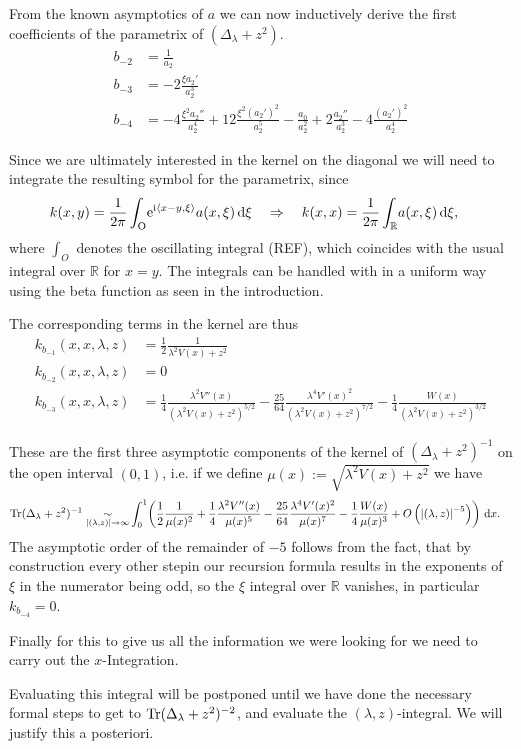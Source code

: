 From the known asymptotics of $a$ we can now inductively derive the first
coefficients of the parametrix of $(\Delta_\lambda + z^2)$.
\begin{align*}
  b_{-2} &= \frac{1}{a_2} \\
  b_{-3} &= -2\frac{\xi a_2'}{a_2^3}\\
  b_{-4} &= -4\frac{\xi^2 a_2''}{a_2^4}
  + 12\frac{\xi^2 (a_2')^2}{a_2^5} - \frac{a_0}{a_2^2} +
  2\frac{a_2''}{a_2^3} -4\frac{(a_2')^2}{a_2^4}
  \label{eqn:coeff-symbol}
\end{align*}

Since we are ultimately interested in the kernel on the diagonal we will need to
integrate the resulting symbol for the parametrix, since
\begin{align*}
  k(x,y) &= \frac{1}{2\pi}\Oscint{\xi}{
    \Eto{\mathrm i\left\langle x-y, \xi\right\rangle} a(x,\xi)
  }
  \quad
  \Rightarrow
  \quad
  k(x,x) = \frac{1}{2\pi}\Integ{\mathbb{R}}{\xi}{a(x,\xi)},
\end{align*}
where $\int_{O}$ denotes the oscillating integral (REF), which coincides with
the usual integral over $\mathbb{R}$ for $x = y$. The integrals can be handled
with in a uniform way using the beta function as seen in the introduction.

The corresponding terms in the kernel are thus
\begin{align}
  k_{b_{-1}}(x,x,\lambda,z) &= \frac{1}{2} \frac{1}{\lambda^2 V(x) + z^2} \\
  k_{b_{-2}}(x,x,\lambda,z) &= 0 \\
  k_{b_{-3}}(x,x,\lambda,z) &= \frac{1}{4} \frac{\lambda^2 V''(x)}{(\lambda^2
    V(x) + z^2)^{5/2}} - \frac{25}{64} \frac{\lambda^4 V'(x)^2}{(\lambda^2V(x)
    + z^2)^{7/2}} -\frac{1}{4}\frac{W(x)}{(\lambda^2 V(x) + z^2)^{3/2}}
  \label{eqn:coeff-kernel}
\end{align}

These are the first three asymptotic components of the kernel of
$(\Delta_\lambda + z^2)^{-1}$ on the open interval $(0,1)$, i.e. if we define
$\mu(x) := \sqrt{\lambda^2 V(x) + z^2}$ we have
\begin{align*}
  \Tr(\Delta_\lambda + z^2)^{-1} \SimAs{\Abs{(\lambda, z)}\to\infty}&
   \Int{x}{\left(
      \frac12\frac1{\mu(x)^{2}}
     +\frac14\frac{\lambda^2 V''(x)}{\mu(x)^5}
     -\frac{25}{64}\frac{\lambda^4V'(x)^2}{\mu(x)^7}
     -\frac14\frac{W(x)}{\mu(x)^3}
     +O\left(\Abs{(\lambda, z)}^{-5}\right)
   \right)}.
\end{align*}
The asymptotic order of the remainder of $-5$ follows from the fact, that by
construction every other stepin our recursion formula results in the exponents
of $\xi$ in the numerator being odd, so the $\xi$ integral over $\mathbb{R}$
vanishes, in particular $k_{b_{-4}} = 0$.

Finally for this to give us all the information we were looking for we need to
carry out the $x$-Integration.

Evaluating this integral will be postponed until we have done the necessary
formal steps to get to $\Tr(\Delta_\lambda + z^2)^{-2}$, and evaluate the 
$(\lambda,z)$-integral. We will justify this a posteriori.
